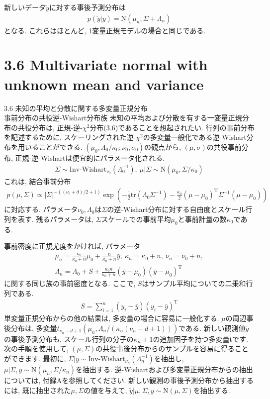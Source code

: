 \documentclass[10pt,dvipdfmx,a4]{beamer}
\newcommand{\eqn}[1]{\begin{align*}#1\end{align*}}
\begin{document}

\begin{frame}[t]
新しいデータ$\tilde{y}$に対する事後予測分布は
\eqn{p(\tilde{y}|y)=\text{N}(\mu_n,\Sigma+\Lambda_n)}
となる.
これらはほとんど, 1変量正規モデルの場合と同じである.
\end{frame}

\section{3.6 Multivariate normal with unknown mean and variance}
\begin{frame}{3.6 未知の平均と分散に関する多変量正規分布\\事前分布の共役逆-Wishart分布族}
未知の平均および分散を有する一変量正規分布の共役分布は, 正規-逆-$\chi^2$分布(3.6)であることを想起されたい.
行列の事前分布を記述するために, スケーリングされた逆-$\chi^2$の多変量一般化である逆-Wishart分布を用いることができる.
$(\mu_0,\Lambda_0/\kappa_0;\nu_0, \sigma_0)$の観点から, $(\mu,\sigma)$の共役事前分布, 正規-逆-Wishartは便宜的にパラメータ化される.
\eqn{\Sigma\sim\text{Inv-Wishart}_{\nu_0}(\Lambda_0^{-1}),\ \mu|\Sigma\sim\text{N}(\mu_0,\Sigma/\kappa_0)}
これは, 結合事前分布
\eqn{p(\mu,\Sigma)\propto|\Sigma|^{-((\nu_0+d)/2+1)}\exp \left(-\frac{1}{2}\text{tr}(\Lambda_0\Sigma^{-1})-\frac{\kappa_0}{2}(\mu-\mu_0)^{\mathrm{T}}\Sigma^{-1}(\mu-\mu_0)\right)}
に対応する.
パラメータ$\nu_0, \Lambda_0$は$\Sigma$の逆-Wishart分布に対する自由度とスケール行列を表す.
残るパラメータは, $\Sigma$スケールでの事前平均$\mu_0$と事前計量の数$\kappa_0$である.
\end{frame}


\begin{frame}
事前密度に正規尤度をかければ, パラメータ
\eqn{\mu_n=\frac{\kappa_0}{\kappa_0+n}\mu_0+\frac{n}{\kappa_0+n}\bar{y},\ \kappa_n=\kappa_0+n,\ \nu_n=\nu_0+n,\\\Lambda_n=\Lambda_0+S+\frac{\kappa_0n}{\kappa_0+n}(\bar{y}-\mu_0)(\bar{y}-\mu_0)^{\mathrm{T}}}
に関する同じ族の事前密度となる.
ここで, $S$はサンプル平均についての二乗和行列である.
\eqn{S=\sum_{i=1}^n(y_i-\bar{y})(y_i-\bar{y})^{\mathrm{T}}}
単変量正規分布からの他の結果は, 多変量の場合に容易に一般化する.
$\mu$の周辺事後分布は, 多変量$t_{\nu_n-d+1}(\mu_n,\Lambda_n/(\kappa_n(\nu_n-d+1)))$である.
新しい観測値$\tilde{y}$の事後予測分布も, スケール行列の分子の$\kappa_n+1$の追加因子を持つ多変量tです.
次の手順を使用して, $(\mu,\Sigma)$の共役事後分布からのサンプルを容易に得ることができます.
最初に, $\Sigma|y\sim \text{Inv-Wishart}_{\nu_n}(\Lambda^{- 1}_n)$を抽出し, $\mu|\Sigma,y\sim \text{N}(\mu_n, \Sigma/\kappa_n)$を抽出する.
逆-Wishartおよび多変量正規分布からの抽出については, 付録Aを参照してください.
新しい観測の事後予測分布から抽出するには, 既に抽出された$\mu, \Sigma$の値を与えて, $\tilde{y}|\mu,\Sigma,y\sim\text{N}(\mu,\Sigma)$を抽出する.
\end{frame}
\end{document}
